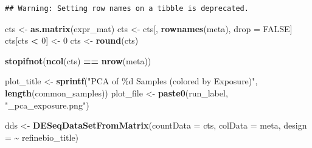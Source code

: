 \documentclass[
]{article}
\newenvironment{Shaded}{\begin{snugshade}}{\end{snugshade}}
\newcommand{\AttributeTok}[1]{\textcolor[rgb]{0.13,0.29,0.53}{#1}}
\newcommand{\ConstantTok}[1]{\textcolor[rgb]{0.56,0.35,0.01}{#1}}
\newcommand{\DecValTok}[1]{\textcolor[rgb]{0.00,0.00,0.81}{#1}}
\newcommand{\FunctionTok}[1]{\textcolor[rgb]{0.13,0.29,0.53}{\textbf{#1}}}
\newcommand{\NormalTok}[1]{#1}
\newcommand{\OtherTok}[1]{\textcolor[rgb]{0.56,0.35,0.01}{#1}}
\newcommand{\SpecialCharTok}[1]{\textcolor[rgb]{0.81,0.36,0.00}{\textbf{#1}}}
\newcommand{\StringTok}[1]{\textcolor[rgb]{0.31,0.60,0.02}{#1}}
\begin{document}
\begin{Shaded}
\end{Shaded}

\begin{verbatim}
## Warning: Setting row names on a tibble is deprecated.
\end{verbatim}

\begin{Shaded}
\begin{Highlighting}[]
\NormalTok{cts }\OtherTok{\textless{}{-}} \FunctionTok{as.matrix}\NormalTok{(expr\_mat)}
\NormalTok{cts }\OtherTok{\textless{}{-}}\NormalTok{ cts[, }\FunctionTok{rownames}\NormalTok{(meta), drop }\OtherTok{=} \ConstantTok{FALSE}\NormalTok{]}
\NormalTok{cts[cts }\SpecialCharTok{\textless{}} \DecValTok{0}\NormalTok{] }\OtherTok{\textless{}{-}} \DecValTok{0}
\NormalTok{cts }\OtherTok{\textless{}{-}} \FunctionTok{round}\NormalTok{(cts)}

\FunctionTok{stopifnot}\NormalTok{(}\FunctionTok{ncol}\NormalTok{(cts) }\SpecialCharTok{==} \FunctionTok{nrow}\NormalTok{(meta))}

\NormalTok{plot\_title }\OtherTok{\textless{}{-}} \FunctionTok{sprintf}\NormalTok{(}\StringTok{"PCA of \%d Samples (colored by Exposure)"}\NormalTok{, }\FunctionTok{length}\NormalTok{(common\_samples))}
\NormalTok{plot\_file }\OtherTok{\textless{}{-}} \FunctionTok{paste0}\NormalTok{(run\_label, }\StringTok{"\_pca\_exposure.png"}\NormalTok{)}

\NormalTok{dds }\OtherTok{\textless{}{-}} \FunctionTok{DESeqDataSetFromMatrix}\NormalTok{(}\AttributeTok{countData =}\NormalTok{ cts,}
                              \AttributeTok{colData =}\NormalTok{ meta,}
                              \AttributeTok{design =} \SpecialCharTok{\textasciitilde{}}\NormalTok{ refinebio\_title)}
\end{Highlighting}
\end{Shaded}
\end{document}
